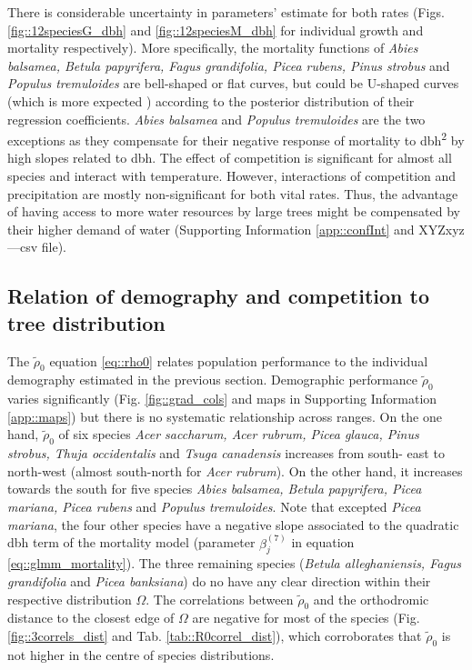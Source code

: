 There is considerable uncertainty in parameters' estimate for both rates (Figs. \ref{fig::12speciesG_dbh} and \ref{fig::12speciesM_dbh} for individual growth and mortality respectively). More specifically, the mortality functions of \textit{Abies balsamea, Betula papyrifera, Fagus grandifolia, Picea rubens, Pinus strobus} and \textit{Populus tremuloides} are bell-shaped or flat curves, but could be U-shaped curves (which is more expected \citep{Lines2010}) according to the posterior distribution of their regression coefficients. \textit{Abies balsamea} and \textit{Populus tremuloides} are the two exceptions as they compensate for their negative response of mortality to dbh\textsuperscript{2} by high slopes related to dbh. The effect of competition is significant for almost all species and interact with temperature. However, interactions of competition and precipitation are mostly non-significant for both vital rates. Thus, the advantage of having access to more water resources by large trees might be compensated by their higher demand of water (Supporting Information \ref{app::confInt} and XYZxyz---csv file).

\subsection{Relation of demography and competition to tree distribution} %
The $ \tilde \rho_0 $ equation \eqref{eq::rho0} relates population performance to the individual demography estimated in the previous section. Demographic performance $ \tilde \rho_0 $ varies significantly (Fig. \ref{fig::grad_cols} and maps in Supporting Information \ref{app::maps}) but there is no systematic relationship across ranges. On the one hand, $ \tilde \rho_0 $ of six species \textit{Acer saccharum, Acer rubrum, Picea glauca, Pinus strobus, Thuja occidentalis} and \textit{Tsuga canadensis} increases from south- east to north-west (almost south-north for \textit{Acer rubrum}). On the other hand, it increases towards the south for five species \textit{Abies balsamea, Betula papyrifera, Picea mariana, Picea rubens} and \textit{Populus tremuloides}. Note that excepted \textit{Picea mariana}, the four other species have a negative slope associated to the quadratic dbh term of the mortality model (parameter $ \beta_j^{(7)} $ in equation \eqref{eq::glmm_mortality}). The three remaining species (\textit{Betula alleghaniensis, Fagus grandifolia} and \textit{Picea banksiana}) do no have any clear direction within their respective distribution $ \Omega $. The correlations between $ \tilde \rho_0 $ and the orthodromic distance to the closest edge of $ \Omega $ are negative for most of the species (Fig. \ref{fig::3correls_dist} and Tab. \ref{tab::R0correl_dist}), which corroborates that $ \tilde \rho_0 $ is not higher in the centre of species distributions.

